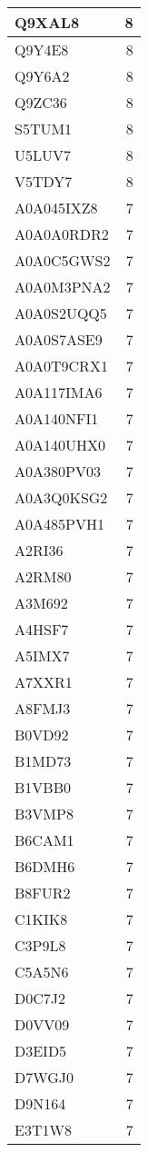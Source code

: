 \documentclass[
]{book}
\theoremstyle{definition}
\theoremstyle{definition}
\theoremstyle{definition}
\theoremstyle{definition}
\theoremstyle{remark}
\begin{document}
\begin{table}
\begin{tabular}{l|r}
\hline
Q9XAL8 & 8\\
\hline
Q9Y4E8 & 8\\
\hline
Q9Y6A2 & 8\\
\hline
Q9ZC36 & 8\\
\hline
S5TUM1 & 8\\
\hline
U5LUV7 & 8\\
\hline
V5TDY7 & 8\\
\hline
A0A045IXZ8 & 7\\
\hline
A0A0A0RDR2 & 7\\
\hline
A0A0C5GWS2 & 7\\
\hline
A0A0M3PNA2 & 7\\
\hline
A0A0S2UQQ5 & 7\\
\hline
A0A0S7ASE9 & 7\\
\hline
A0A0T9CRX1 & 7\\
\hline
A0A117IMA6 & 7\\
\hline
A0A140NFI1 & 7\\
\hline
A0A140UHX0 & 7\\
\hline
A0A380PV03 & 7\\
\hline
A0A3Q0KSG2 & 7\\
\hline
A0A485PVH1 & 7\\
\hline
A2RI36 & 7\\
\hline
A2RM80 & 7\\
\hline
A3M692 & 7\\
\hline
A4HSF7 & 7\\
\hline
A5IMX7 & 7\\
\hline
A7XXR1 & 7\\
\hline
A8FMJ3 & 7\\
\hline
B0VD92 & 7\\
\hline
B1MD73 & 7\\
\hline
B1VBB0 & 7\\
\hline
B3VMP8 & 7\\
\hline
B6CAM1 & 7\\
\hline
B6DMH6 & 7\\
\hline
B8FUR2 & 7\\
\hline
C1KIK8 & 7\\
\hline
C3P9L8 & 7\\
\hline
C5A5N6 & 7\\
\hline
D0C7J2 & 7\\
\hline
D0VV09 & 7\\
\hline
D3EID5 & 7\\
\hline
D7WGJ0 & 7\\
\hline
D9N164 & 7\\
\hline
E3T1W8 & 7\\

\end{tabular}
\end{table}
\end{document}
